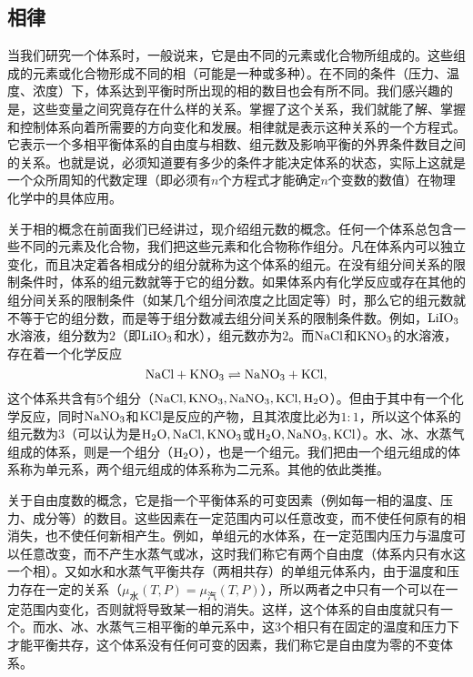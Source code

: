 ﻿\subsection{相律}
当我们研究一个体系时，一般说来，它是由不同的元素或化合物所组成的。这些组成的元素或化合物形成不同的相（可能是一种或多种）。在不同的条件（压力、温度、浓度）下，体系达到平衡时所出现的相的数目也会有所不同。我们感兴趣的是，这些变量之间究竟存在什么样的关系。掌握了这个关系，我们就能了解、掌握和控制体系向着所需要的方向变化和发展。相律就是表示这种关系的一个方程式。它表示一个多相平衡体系的自由度与相数、组元数及影响平衡的外界条件数目之间的关系。也就是说，必须知道要有多少的条件才能决定体系的状态，实际上这就是一个众所周知的代数定理（即必须有$n$个方程式才能确定$n$个变数的数值）在物理化学中的具体应用。

关于相的概念在前面我们已经讲过，现介绍组元数的概念。任何一个体系总包含一些不同的元素及化合物，我们把这些元素和化合物称作组分。凡在体系内可以独立变化，而且决定着各相成分的组分就称为这个体系的组元。在没有组分间关系的限制条件时，体系的组元数就等于它的组分数。如果体系内有化学反应或存在其他的组分间关系的限制条件（如某几个组分间浓度之比固定等）时，那么它的组元数就不等于它的组分数，而是等于组分数减去组分间关系的限制条件数。例如，$\rm LiIO_3$水溶液，组分数为$2$（即$\rm LiIO_3$和水），组元数亦为$2$。而$\rm NaCl$和$\rm KNO_3$的水溶液，存在着一个化学反应
$$\rm NaCl + KNO_3 \rightleftharpoons NaNO_3+KCl,$$
这个体系共含有5个组分（$\rm NaCl,KNO_3,NaNO_3,KCl,H_2O$）。但由于其中有一个化学反应，同时$\rm NaNO_3$和$\rm KCl$是反应的产物，且其浓度比必为$1:1$，所以这个体系的组元数为3（可以认为是$\rm H_2O,NaCl,KNO_3$或$\rm H_2O,NaNO_3,KCl$）。水、冰、水蒸气组成的体系，则是一个组分（$\rm H_2O$），也是一个组元。我们把由一个组元组成的体系称为单元系，两个组元组成的体系称为二元系。其他的依此类推。

关于自由度数的概念，它是指一个平衡体系的可变因素（例如每一相的温度、压力、成分等）的数目。这些因素在一定范围内可以任意改变，而不使任何原有的相消失，也不使任何新相产生。例如，单组元的水体系，在一定范围内压力与温度可以任意改变，而不产生水蒸气或冰，这时我们称它有两个自由度（体系内只有水这一个相）。又如水和水蒸气平衡共存（两相共存）的单组元体系内，由于温度和压力存在一定的关系（$\mu_\text{水}(T,P)=\mu_\text{汽}(T,P)$），所以两者之中只有一个可以在一定范围内变化，否则就将导致某一相的消失。这样，这个体系的自由度就只有一个。而水、冰、水蒸气三相平衡的单元系中，这3个相只有在固定的温度和压力下才能平衡共存，这个体系没有任何可变的因素，我们称它是自由度为零的不变体系。


